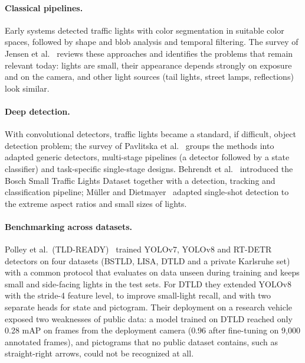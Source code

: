 \paragraph{Classical pipelines.} Early systems detected traffic lights with color segmentation in
suitable color spaces, followed by shape and blob analysis and temporal filtering. The survey of Jensen
et al.~\cite{jensen2016vision} reviews these approaches and identifies the problems that remain
relevant today: lights are small, their appearance depends strongly on exposure and on the camera, and
other light sources (tail lights, street lamps, reflections) look similar.

\paragraph{Deep detection.} With convolutional detectors, traffic lights became a standard, if
difficult, object detection problem; the survey of Pavlitska et al.~\cite{pavlitska2023survey} groups
the methods into adapted generic detectors, multi-stage pipelines (a detector followed by a state
classifier) and task-specific single-stage designs. Behrendt et al.~\cite{behrendt2017deep}
introduced the Bosch Small Traffic Lights Dataset together with a detection, tracking and
classification pipeline; Müller and Dietmayer~\cite{muller2018detecting} adapted single-shot detection
to the extreme aspect ratios and small sizes of lights.

\paragraph{Benchmarking across datasets.} Polley et al.\ (TLD-READY)~\cite{polley2024tldready} trained
YOLOv7, YOLOv8 and RT-DETR detectors on four datasets (BSTLD, LISA, DTLD and a private Karlsruhe set)
with a common protocol that evaluates on data unseen during training and keeps small and side-facing
lights in the test sets. For DTLD they extended YOLOv8 with the stride-4 feature level, to improve
small-light recall, and with two separate heads for state and pictogram. Their deployment on a research
vehicle exposed two weaknesses of public data: a model trained on DTLD reached only 0.28 mAP on frames
from the deployment camera (0.96 after fine-tuning on 9,000 annotated frames), and pictograms that no
public dataset contains, such as straight-right arrows, could not be recognized at all.

